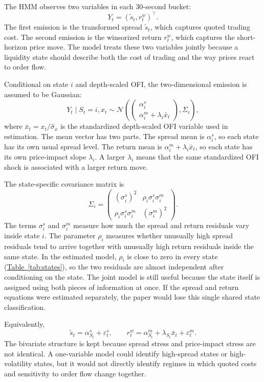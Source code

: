 \documentclass[12pt,a4paper]{article}
\newcommand{\tabref}[1]{\hyperref[#1]{Table~\ref*{#1}}}
\begin{document}
The HMM observes two variables in each 30-second bucket:
\[
Y_t=(\tilde{s}_t,r_t^w)^\top .
\]
The first emission is the transformed spread \(\tilde{s}_t\), which captures quoted trading cost. The second emission is the winsorized return \(r_t^w\), which captures the short-horizon price move. The model treats these two variables jointly because a liquidity state should describe both the cost of trading and the way prices react to order flow.

Conditional on state \(i\) and depth-scaled OFI, the two-dimensional emission is assumed to be Gaussian:
\[
Y_t\mid S_t=i,x_t
\sim
\mathcal{N}\left(
\begin{pmatrix}
\alpha^s_i\\
\alpha^m_i+\lambda_i \bar{x}_t
\end{pmatrix},
\Sigma_i
\right),
\]
where \(\bar{x}_t=x_t/\widehat{\sigma}_x\) is the standardized depth-scaled OFI variable used in estimation. The mean vector has two parts. The spread mean is \(\alpha^s_i\), so each state has its own usual spread level. The return mean is \(\alpha^m_i+\lambda_i\bar{x}_t\), so each state has its own price-impact slope \(\lambda_i\). A larger \(\lambda_i\) means that the same standardized OFI shock is associated with a larger return move.

The state-specific covariance matrix is
\[
\Sigma_i=
\begin{pmatrix}
(\sigma^s_i)^2 & \rho_i\sigma^s_i\sigma^m_i\\
\rho_i\sigma^s_i\sigma^m_i & (\sigma^m_i)^2
\end{pmatrix}.
\]
The terms \(\sigma^s_i\) and \(\sigma^m_i\) measure how much the spread and return residuals vary inside state \(i\). The parameter \(\rho_i\) measures whether unusually high spread residuals tend to arrive together with unusually high return residuals inside the same state. In the estimated model, \(\rho_i\) is close to zero in every state (\tabref{tab:states}), so the two residuals are almost independent after conditioning on the state. The joint model is still useful because the state itself is assigned using both pieces of information at once. If the spread and return equations were estimated separately, the paper would lose this single shared state classification.

Equivalently,
\[
\tilde{s}_t=\alpha^s_{S_t}+\varepsilon^s_t,
\qquad
r_t^w=\alpha^m_{S_t}+\lambda_{S_t}\bar{x}_t+\varepsilon^m_t.
\]
The bivariate structure is kept because spread stress and price-impact stress are not identical. A one-variable model could identify high-spread states or high-volatility states, but it would not directly identify regimes in which quoted costs and sensitivity to order flow change together.
\end{document}
